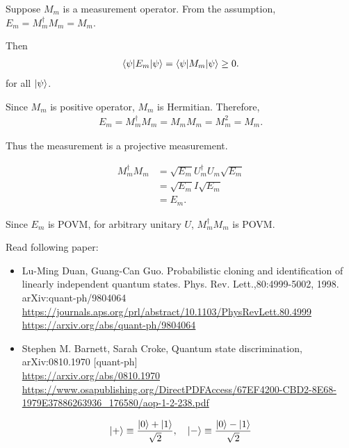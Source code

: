 
Suppose $M_m$ is a measurement operator.
From the assumption, $E_m = M_m^\dagger M_m = M_m$.

Then
\begin{align*}
    \braket{\psi | E_m | \psi} = \braket{\psi | M_m | \psi} \geq 0.
\end{align*}
for all $\ket{\psi}$.

Since $M_m$ is positive operator, $M_m$ is Hermitian.
Therefore,
\begin{align*}
    E_m = M_m^\dagger M_m = M_m M_m = M_m^2 = M_m.
\end{align*}

Thus the measurement is a projective measurement.



\begin{align*}
    M_m^\dagger M_m &= \sqrt{E_m} U_m^\dagger U_m \sqrt{E_m}\\
        &= \sqrt{E_m} I \sqrt{E_m}\\
        &= E_m.
\end{align*}

Since $E_m$ is POVM,  for arbitrary  unitary $U$, $M_m^\dagger M_m$ is POVM.



Read following paper:
\begin{itemize}
    \item Lu-Ming Duan, Guang-Can Guo.  Probabilistic cloning and identification of linearly independent quantum states. Phys. Rev. Lett.,80:4999-5002, 1998. arXiv:quant-ph/9804064\\
    \url{https://journals.aps.org/prl/abstract/10.1103/PhysRevLett.80.4999}\\
    \url{https://arxiv.org/abs/quant-ph/9804064}
%
    \item Stephen M. Barnett, Sarah Croke, Quantum state discrimination, arXiv:0810.1970 [quant-ph]\\
    \url{https://arxiv.org/abs/0810.1970}\\
    \url{https://www.osapublishing.org/DirectPDFAccess/67EF4200-CBD2-8E68-1979E37886263936_176580/aop-1-2-238.pdf}
\end{itemize}


\begin{align*}
    \ket{+} \equiv \frac{\ket{0} + \ket{1}}{\sqrt{2}}, ~~~ \ket{-} \equiv \frac{\ket{0} - \ket{1}}{\sqrt{2}}
\end{align*}


